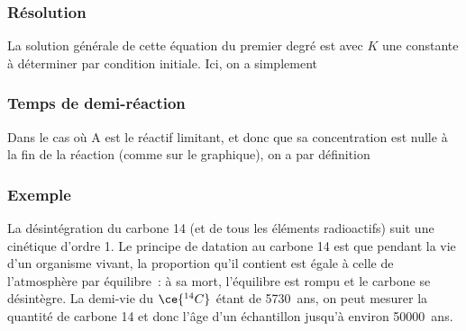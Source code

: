 \documentclass[../../main/main.tex]{subfiles}
\begin{document}
\subsubsection{Résolution}
La solution générale de cette équation du premier degré est
\psw{
	\[[{\ce{A}}](t) = K\exp(-kat)\]
}
avec $K$ une constante à déterminer par condition initiale. Ici, on a simplement

\begin{center}
\end{center}

\subsubsection{Temps de demi-réaction}
Dans le cas où A est le réactif limitant, et donc que sa concentration est nulle
à la fin de la réaction (comme sur le graphique), on a par définition

\subsubsection{Exemple}
La désintégration du carbone 14 (et de tous les éléments radioactifs) suit une
cinétique d'ordre 1. Le principe de datation au carbone 14 est que pendant la
vie d'un organisme vivant, la proportion qu'il contient est égale à celle de
l'atmosphère par équilibre~: à sa mort, l'équilibre est rompu et le carbone se
désintègre. La demi-vie du ${\ce{^{14}C}}$ étant de
\SI{5730}{ans}, on peut mesurer la quantité de carbone 14 et donc l'âge d'un
échantillon jusqu'à environ \SI{50000}{ans}.
\end{document}
